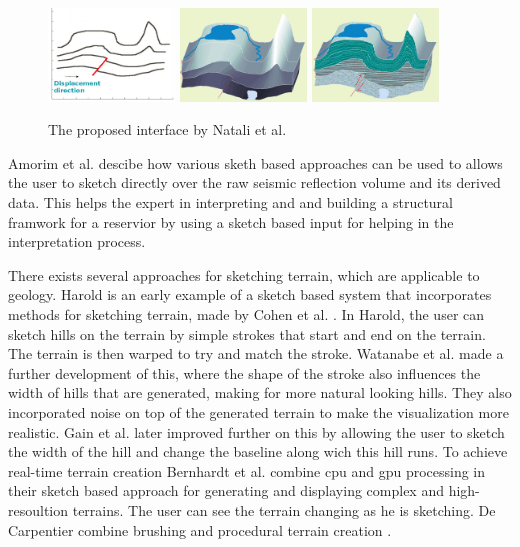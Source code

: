 \documentclass[a4paper,12pt]{report}
\begin{document}
\begin{figure}
 
 \centering
    \includegraphics[width=0.3\textwidth]{thesis/related/natali1.png}
    \includegraphics[width=0.3\textwidth]{thesis/related/natali2.png}
    \includegraphics[width=0.3\textwidth]{thesis/related/natali3.png}
  \caption{The proposed interface by Natali et al. }
  \label{fig:nataliRapid}
\end{figure}

Amorim et al. \cite{amorim2012sketch} descibe how various sketh based approaches can be used to allows the user to sketch directly over the raw seismic reflection volume and its derived data. This helps the expert in interpreting and and building a structural framwork for a reservior by using a sketch based input for helping in the interpretation process.

There exists several approaches for sketching terrain, which are applicable to geology. Harold is an early example of a sketch based system that incorporates methods for sketching terrain, made by Cohen et al. \cite{cohen2000harold}. In Harold, the user can sketch hills on the terrain by simple strokes that start and end on the terrain. The terrain is then warped to try and match the stroke. Watanabe et al.  \cite{Watanabe:2004:SIT:1186415.1186500} made a further development of this, where the shape of the stroke also influences the width of hills that are generated, making for more natural looking hills. They also incorporated noise on top of the generated terrain to make the visualization more realistic. Gain et al. \cite{Gain:2009:TS:1507149.1507155} later improved further on this by allowing the user to sketch the width of the hill and change the baseline along wich this hill runs. To achieve real-time terrain creation Bernhardt et al. combine cpu and gpu processing in their sketch based approach for generating and displaying complex and high-resoultion terrains. The user can see the terrain changing as he is sketching. De Carpentier combine brushing and procedural terrain creation \cite{de2009interactive}.
\end{document}
